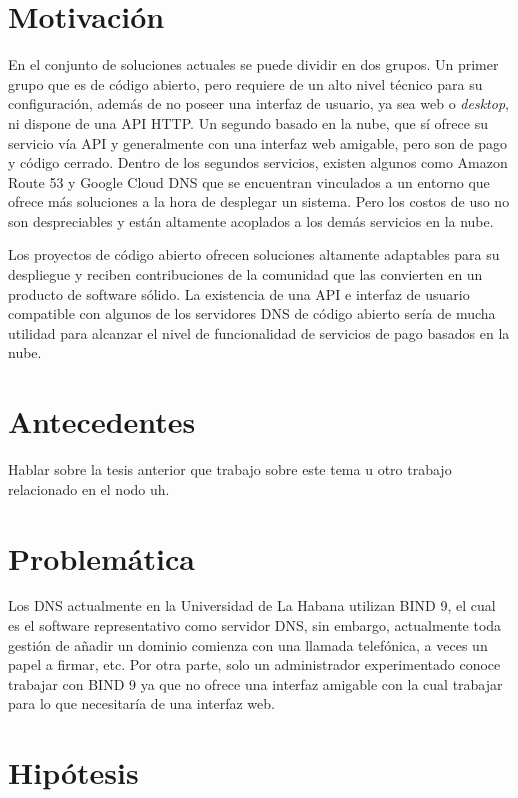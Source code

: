 \section{Motivación}

En el conjunto de soluciones actuales se puede dividir en dos grupos. Un primer grupo que es de código abierto, pero requiere de un alto nivel técnico para su configuración, además de no poseer una interfaz de usuario, ya sea web o \textit{desktop}, ni dispone de una API HTTP. Un segundo basado en la nube, que sí ofrece su servicio vía API y generalmente con una interfaz web amigable, pero son de pago y código cerrado. Dentro de los segundos servicios, existen algunos como Amazon Route 53 y Google Cloud DNS que se encuentran vinculados a un entorno que ofrece más soluciones a la hora de desplegar un sistema. Pero los costos de uso no son despreciables y están altamente acoplados a los demás servicios en la nube.

Los proyectos de código abierto ofrecen soluciones altamente adaptables para su despliegue y reciben contribuciones de la comunidad que las convierten en un producto  de software sólido. La existencia de una API e interfaz de usuario compatible con algunos de los servidores DNS de código abierto sería de mucha utilidad para alcanzar el nivel de funcionalidad de servicios de pago basados en la nube.

\section{Antecedentes}

Hablar sobre la tesis anterior que trabajo sobre este tema u otro trabajo relacionado en el nodo uh.

\section{Problemática}

Los DNS actualmente en la Universidad de La Habana utilizan BIND 9, el cual es el software representativo como servidor DNS, sin embargo, actualmente toda gestión de añadir un dominio comienza con una llamada telefónica, a veces un papel a firmar, etc. Por otra parte, solo un administrador experimentado conoce trabajar con BIND 9 ya que no ofrece una interfaz amigable con la cual trabajar para lo que necesitaría de una interfaz web.

\section{Hipótesis}

